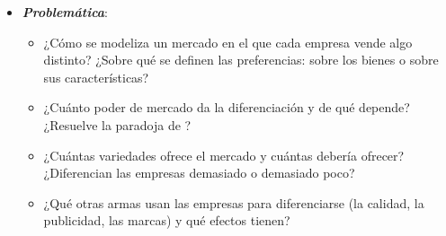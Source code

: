 \documentclass[11pt]{article}
\begin{document}
\begin{itemize}
\begin{itemize}
\begin{itemize}
\begin{itemize}
    \end{itemize}
  \item Un modelo de diferenciación con toda la generalidad posible, en el que cada producto fuera distinto de todos los demás y cada consumidor tuviera sus propios gustos, sería inmanejable. Como advirtió , «un modelo que tomara en cuenta toda la diversidad de la realidad sería tan poco útil como un mapa a escala de uno a uno»\nocite{Robinson1962Essays}.\footnote{En el original: «A model which took account of all the variegation of reality would be of no more use than a map at the scale of one to one».} Por eso cada enfoque elige supuestos simplificadores fuertes: un consumidor representativo y simétrico en el de no direcciones; una sola característica y gustos uniformemente repartidos en el de direcciones.
  \end{itemize}
  \end{itemize}

\item \textbf{\emph{Problemática}}:
  \begin{itemize}
  \item ¿Cómo se modeliza un mercado en el que cada empresa vende algo distinto? ¿Sobre qué se definen las preferencias: sobre los bienes o sobre sus características?
  \item ¿Cuánto poder de mercado da la diferenciación y de qué depende? ¿Resuelve la paradoja de ?
  \item ¿Cuántas variedades ofrece el mercado y cuántas debería ofrecer? ¿Diferencian las empresas demasiado o demasiado poco?
  \item ¿Qué otras armas usan las empresas para diferenciarse (la calidad, la publicidad, las marcas) y qué efectos tienen?
  \end{itemize}


\end{itemize}
\end{document}
